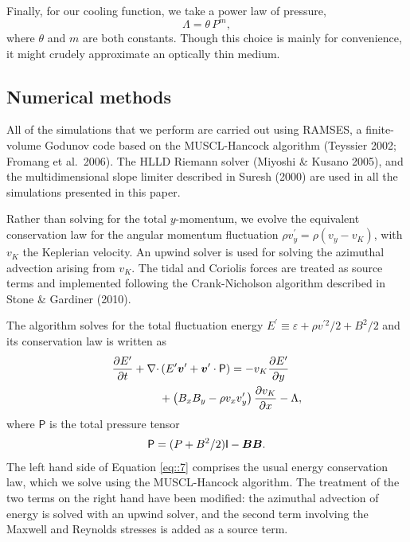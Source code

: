 \documentclass[useAMS]{mn2e}
\begin{document}
Finally, for our cooling function, we take a power law of pressure,
\begin{equation}
\Lambda = \theta\,P^{m},
\end{equation}
where $\theta$ and $m$ are both constants. Though this choice is
mainly for convenience, it might crudely approximate an optically thin medium.




\subsection{Numerical methods}

All of the simulations that we perform are carried out using RAMSES, a finite-volume Godunov code based on the MUSCL-Hancock algorithm 
(Teyssier 2002; Fromang et al.~2006). The HLLD Riemann solver 
(Miyoshi \& Kusano 2005),
 and the multidimensional slope limiter described in Suresh (2000) are used in all the simulations presented in this paper.

Rather than solving for the total $y$-momentum, we evolve the equivalent
conservation law for the angular momentum fluctuation $\rho
v_y^{\prime} =\rho( v_y - v_K)$,
 with $v_K$ the Keplerian velocity. An upwind solver is used for solving the azimuthal advection arising from $v_{K}$.
 The tidal and Coriolis forces are treated as source terms and
implemented following the Crank-Nicholson algorithm described in
Stone \& Gardiner (2010). 

 The algorithm solves for the total fluctuation energy $E^{\prime} \equiv \varepsilon + \rho
v^{\prime 2}/2 + B^2/2 $ and its conservation law is written as
\begin{align} \label{eq::7}
\frac{\partial E^\prime}{\partial t} +  \nabla\cdot &\left(E^\prime{
    \boldsymbol{v}^\prime} + {\boldsymbol{v}^\prime} \cdot \mathsf{P} \right) = -v_K\frac{\partial E^\prime}{\partial y} \notag\\
    &+ \left(B_xB_y - \rho v_x v_y^{\prime} \right)\frac{\partial v_K}{\partial x} -\Lambda,
\end{align}
where $\mathsf{P}$ is the total pressure tensor
\begin{align}
\mathsf{P} = (P + B^2/2)\sf{I} - \boldsymbol{B}\boldsymbol{B}.
\end{align}
The left hand side of Equation \eqref{eq::7} comprises the usual energy conservation law,
which we solve using the MUSCL-Hancock algorithm. 
The treatment of the two terms on the right hand
have been modified: the azimuthal 
advection of energy is solved with an upwind solver, and the second
term involving the Maxwell and 
Reynolds stresses is added as a source term. 
\end{document}
